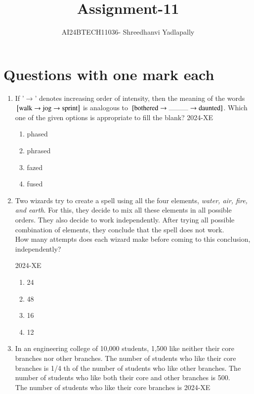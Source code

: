 \documentclass[journal,12pt,onecolumn]{IEEEtran}
\theoremstyle{remark}
\begin{document}

\vspace{3cm}

\title{Assignment-11}
\author{AI24BTECH11036- Shreedhanvi Yadlapally}
\maketitle

\bigskip
\renewcommand{\thefigure}{\theenumi}
\renewcommand{\thetable}{\theenumi}
\section{Questions with one mark each}

\begin{enumerate}

	\item If '$\to$' denotes increasing order of intensity, then the meaning of the words ${}\left[\text{walk} \to \text{jog} \to \text{sprint}\right]$ is analogous to $\sbrak{\text{bothered} \to \rule{1cm}{0.2pt} \to \text{daunted}}$. Which one of the given options is appropriate to fill the blank?
		\hfill{2024-XE}
	\begin{enumerate}
	\item phased 
	\item phrased
	\item fazed
	\item fused
	\end{enumerate}

\item Two wizards try to create a spell using all the four elements, \textit{water, air, fire, and earth}. For this, they decide to mix all these elements in all possible orders. They also decide to work independently. After trying all possible combination of elements, they conclude that the spell does not work. \\
How many attempts does each wizard make before coming to this conclusion,
independently?

\hfill{2024-XE}


	\begin{enumerate}
		\item 24
		\item 48
		\item 16
		\item 12
	\end{enumerate}

\item In an engineering college of 10,000 students, 1,500 like neither their core branches nor other branches. The number of students who like their core branches is 1/4 th of the number of students who like other branches. The number of students who like both their core and other branches is 500. \\
The number of students who like their core branches is
\hfill{2024-XE}


\end{enumerate}
\end{document}
